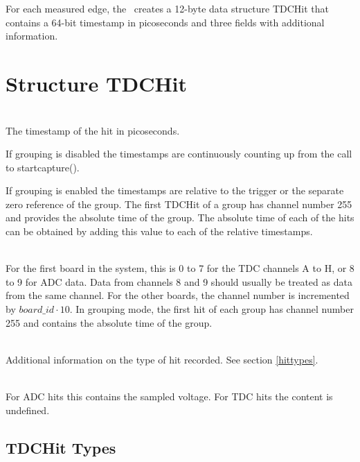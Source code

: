 For each measured edge, the \deviceName\ creates a 12-byte data structure TDCHit that contains a 64-bit timestamp in picoseconds and three fields with additional information. 

\section{Structure TDCHit}
\label{TDCHit}
\\
The timestamp of the hit in picoseconds. 

If grouping is disabled the timestamps are continuously counting up from the call to \textsf{\prefix start\tu capture()}.

If grouping is enabled the timestamps are relative to the trigger or the separate zero reference of the group. 
The first TDCHit of a group has channel number 255 and provides the absolute time of the group. 
The absolute time of each of the hits can be obtained by adding this value to each of the relative timestamps.

\\
For the first board in the system, this is 0 to 7 for the TDC channels A to H, or 8 to 9 for ADC data. Data from channels 8 and 9 should usually be treated as data from the same channel. 
For the other boards, the channel number is incremented by $board\_id \cdot 10$.
In grouping mode, the first hit of each group has channel number 255 and contains the absolute time of the group.

\\
Additional information on the type of hit recorded. See section \ref{hittypes}.

\\
For ADC hits this contains the sampled voltage. For TDC hits the content is undefined.

\newpage
\subsection{TDCHit Types \label{hittypes}}
\newcommand{\HTYPE}{\PREFIX TDCHIT\tu TYPE\tu}

